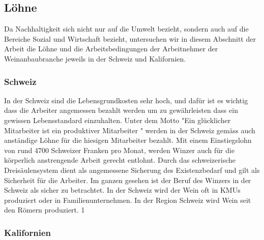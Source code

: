 \subsection{Löhne}
Da Nachhaltigkeit sich nicht nur auf die Umwelt bezieht, sondern auch auf die Bereiche Sozial und Wirtschaft bezieht, untersuchen wir in diesem Abschnitt der Arbeit die Löhne und die Arbeitsbedingungen der Arbeitnehmer der Weinanbaubranche jeweils in der Schweiz und Kalifornien.

\subsubsection{Schweiz}
In der Schweiz sind die Lebensgrundkosten sehr hoch, und dafür ist es wichtig dass die Arbeiter angemessen bezahlt werden um zu gewährleisten dass ein gewissen Lebensstandard einzuhalten. Unter dem Motto "Ein glücklicher Mitarbeiter ist ein produktiver Mitarbeiter " werden in der Schweiz gemäss
\cite{_branchenverband} auch anständige Löhne für die hiesigen Mitarbeiter bezahlt. Mit einem Einstiegslohn von rund 4700 Schweizer Franken pro Monat, werden Winzer auch für die körperlich anstrengende Arbeit gerecht entlohnt. Durch das schweizerische Dreisäulensystem dient als angemessene Sicherung des Existenzbedarf und gilt als Sicherheit für die Arbeiter. Im ganzen gesehen ist der Beruf des Winzers in der Schweiz als sicher zu betrachtet. In der Schweiz wird der Wein oft in KMUs produziert oder in Familienunternehmen. In der Region Schweiz wird Wein seit den Römern produziert. 1

\subsubsection{Kalifornien}

